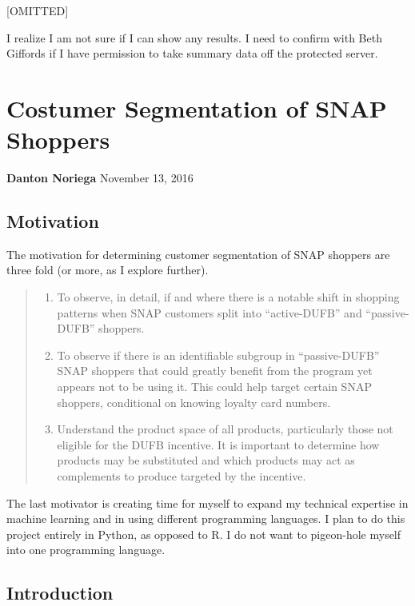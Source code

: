 \documentclass[12pt,letterpaperpaper,]{book}
\providecommand{\tightlist}{%
  \setlength{\itemsep}{0pt}\setlength{\parskip}{0pt}}
\begin{document}
{[}OMITTED{]}

I realize I am not sure if I can show any results. I need to confirm
with Beth Giffords if I have permission to take summary data off the
protected server.

\chapter{Costumer Segmentation of SNAP
Shoppers}\label{costumer-segmentation-of-snap-shoppers}

\textbf{Danton Noriega} November 13, 2016

\section*{Motivation}\label{motivation}

The motivation for determining customer segmentation of SNAP shoppers
are three fold (or more, as I explore further).

\begin{quote}
\begin{enumerate}
\def\labelenumi{\arabic{enumi}.}
\tightlist
\item
  To observe, in detail, if and where there is a notable shift in
  shopping patterns when SNAP customers split into ``active-DUFB'' and
  ``passive-DUFB'' shoppers.
\item
  To observe if there is an identifiable subgroup in ``passive-DUFB''
  SNAP shoppers that could greatly benefit from the program yet appears
  not to be using it. This could help target certain SNAP shoppers,
  conditional on knowing loyalty card numbers.
\item
  Understand the product space of all products, particularly those not
  eligible for the DUFB incentive. It is important to determine how
  products may be substituted and which products may act as complements
  to produce targeted by the incentive.
\end{enumerate}
\end{quote}

The last motivator is creating time for myself to expand my technical
expertise in machine learning and in using different programming
languages. I plan to do this project entirely in Python, as opposed to
R. I do not want to pigeon-hole myself into one programming language.

\section*{Introduction}\label{introduction}
\end{document}
